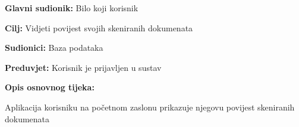 					\noindent {}
					\begin{packed_item}
	
						\item \textbf{Glavni sudionik:} Bilo koji korisnik
						\item  \textbf{Cilj:} Vidjeti povijest svojih skeniranih dokumenata
						\item  \textbf{Sudionici:} Baza podataka
						\item  \textbf{Preduvjet:} Korisnik je prijavljen u sustav
						\item  \textbf{Opis osnovnog tijeka:}
						
						\item[] \begin{packed_enum}
	
							\item Aplikacija korisniku na početnom zaslonu prikazuje njegovu povijest skeniranih dokumenata

						\end{packed_enum}

					\end{packed_item}


